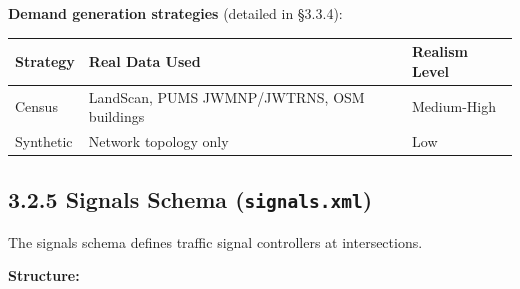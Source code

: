 \textbf{Demand generation strategies} (detailed in §3.3.4):

\begin{longtable}[]{@{}lll@{}}
\toprule\noalign{}
Strategy & Real Data Used & Realism Level \\
\midrule\noalign{}
\endhead
\bottomrule\noalign{}
\endlastfoot
Census & LandScan, PUMS JWMNP/JWTRNS, OSM buildings & Medium-High \\
Synthetic & Network topology only & Low \\
\end{longtable}

\subsection{\texorpdfstring{3.2.5 Signals Schema
(\texttt{signals.xml})}{3.2.5 Signals Schema (signals.xml)}}\label{325-signals-schema-signalsxml}

The signals schema defines traffic signal controllers at intersections.

\textbf{Structure:}

\begin{Shaded}
\begin{Highlighting}[]
\NormalTok{\textless{}}\NormalTok{\textgreater{}}
\NormalTok{  \textless{}}\NormalTok{\textgreater{}}
\NormalTok{    \textless{}}\NormalTok{/\textgreater{}}
\NormalTok{    \textless{}}\NormalTok{/\textgreater{}}
\NormalTok{    \textless{}}\NormalTok{/\textgreater{}}
\NormalTok{    \textless{}}\NormalTok{/\textgreater{}}
\NormalTok{    \textless{}}\NormalTok{/\textgreater{}}
\NormalTok{  \textless{}/}\NormalTok{\textgreater{}}
\NormalTok{\textless{}/}\NormalTok{\textgreater{}}
\end{Highlighting}
\end{Shaded}

